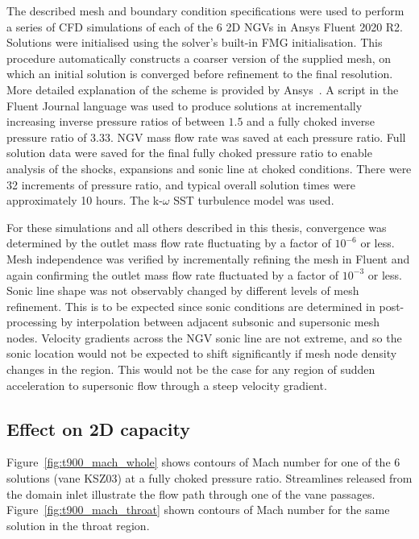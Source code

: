 \documentclass[a4paper, 11pt, oneside]{report}
\begin{document}
The described mesh and boundary condition specifications were used to perform a series of CFD simulations of each of the 6 2D NGVs in Ansys Fluent 2020 R2. Solutions were initialised using the solver's built-in FMG initialisation. This procedure automatically constructs a coarser version of the supplied mesh, on which an initial solution is converged before refinement to the final resolution. More detailed explanation of the scheme is provided by Ansys~\cite{ansys_fmg_initialisation}. A script in the Fluent Journal language was used to produce solutions at incrementally increasing inverse pressure ratios of between $1.5$ and a fully choked inverse pressure ratio of $3.33$. NGV mass flow rate was saved at each pressure ratio. Full solution data were saved for the final fully choked pressure ratio to enable analysis of the shocks, expansions and sonic line at choked conditions. There were 32 increments of pressure ratio, and typical overall solution times were approximately 10 hours. The k-$\omega$ SST turbulence model was used. 

For these simulations and all others described in this thesis, convergence was determined by the outlet mass flow rate fluctuating by a factor of $10^{-6}$ or less. Mesh independence was verified by incrementally refining the mesh in Fluent and again confirming the outlet mass flow rate fluctuated by a factor of $10^{-3}$ or less. Sonic line shape was not observably changed by different levels of mesh refinement. This is to be expected since sonic conditions are determined in post-processing by interpolation between adjacent subsonic and supersonic mesh nodes. Velocity gradients across the NGV sonic line are not extreme, and so the sonic location would not be expected to shift significantly if mesh node density changes in the region. This would not be the case for any region of sudden acceleration to supersonic flow through a steep velocity gradient.

\subsection{Effect on 2D capacity}

Figure~\ref{fig:t900_mach_whole} shows contours of Mach number for one of the 6 solutions (vane KSZ03) at a fully choked pressure ratio. Streamlines released from the domain inlet illustrate the flow path through one of the vane passages. Figure~\ref{fig:t900_mach_throat} shown contours of Mach number for the same solution in the throat region.
\end{document}
